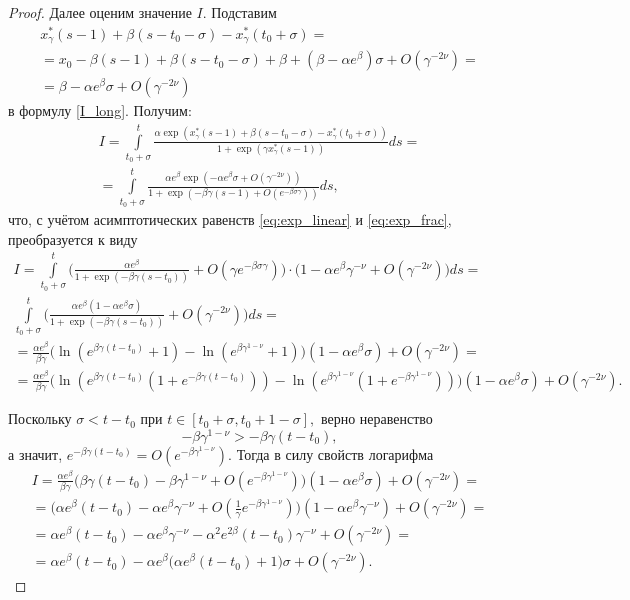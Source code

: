 \begin{proof}
Далее оценим значение $I$. Подставим
%
\begin{multline*}
x^*_{\gamma}(s - 1) + \beta (s - t_0 - \sigma) - x^*_{\gamma} (t_0 + \sigma) =\\
= x_0 - \beta(s - 1) + \beta(s - t_0 - \sigma) + \beta + (\beta - \alpha e^{\beta}) \sigma + O(\gamma^{-2\nu}) =\\
= \beta - \alpha e^{\beta} \sigma + O(\gamma^{-2\nu})
\end{multline*}
%
в формулу \eqref{I_long}. Получим:
\begin{multline*}
	I=\int\limits_{t_0+\sigma}^{t}\frac{\alpha\exp(x_\gamma^*(s-1)+\beta(s-t_0-\sigma)-x_\gamma^*(t_0+\sigma))}{1+\exp(\gamma x_\gamma^*(s-1))} ds =\\
	=\int\limits_{t_0+\sigma}^{t}\frac{\alpha e^{\beta}\exp(-\alpha e^\beta\sigma+O(\gamma^{-2\nu}))}{1+\exp( -\beta\gamma (s-1)+O(e^{-\beta\sigma\gamma}))} ds,
\end{multline*}
%
что, с учётом асимптотических равенств \eqref{eq:exp_linear} и \eqref{eq:exp_frac}, преобразуется к виду
\begin{multline*}
	I = \int\limits_{t_0 + \sigma}^{t}\Big(\frac{\alpha e^\beta}{1 + \exp(-\beta\gamma(s-t_0))} + O(\gamma e^{-\beta\sigma\gamma})\Big) \cdot \big(1-\alpha e^{\beta} \gamma^{-\nu} + O(\gamma^{-2\nu})\big)ds=\\
	\int\limits_{t_0+\sigma}^{t}\Big(\frac{\alpha e^\beta(1-\alpha e^{\beta}\sigma)}{1 + \exp(-\beta\gamma(s-t_0))} + O(\gamma^{-2\nu})\Big)ds=\\
	= \frac{\alpha e^{\beta}}{\beta\gamma}\big(\ln(e^{\beta\gamma(t - t_0)} + 1) - \ln(e^{\beta\gamma^{1-\nu}}+1)\big)(1-\alpha e^{\beta}\sigma)+O(\gamma^{-2\nu})=\\
	= \frac{\alpha e^{\beta}}{\beta\gamma}\big(\ln(e^{\beta\gamma(t-t_0)}(1 + e^{-\beta\gamma(t - t_0)})) - \ln(e^{\beta\gamma^{1 - \nu}}(1 + e^{-\beta\gamma^{1-\nu}}))\big)(1-\alpha e^{\beta}\sigma)+O(\gamma^{-2\nu}).
\end{multline*}
	
Поскольку $\sigma < t - t_0$ при $t \in [t_0+\sigma, t_0 + 1 - \sigma],$ верно неравенство
%
\[-\beta \gamma^{1 - \nu} > - \beta \gamma (t - t_0),\]
%
а значит, $e^{-\beta \gamma (t - t_0)} = O(e^{-\beta\gamma^{1 - \nu}})$.
Тогда в силу свойств логарифма
%
\begin{multline}
	\label{I_step3}
	I=\frac{\alpha e^{\beta}}{\beta\gamma}\big(\beta\gamma(t-t_0)-\beta\gamma^{1-\nu}+O(e^{-\beta\gamma^{1-\nu}})\big)(1-\alpha e^{\beta}\sigma)+O(\gamma^{-2\nu})=\\
	= \big(\alpha e^{\beta}(t-t_0)-\alpha e^{\beta}\gamma^{-\nu} + O(\frac{1}{\gamma} e^{-\beta\gamma^{1-\nu}})\big)(1-\alpha e^{\beta}\gamma^{-\nu})+O(\gamma^{-2\nu})=\\
	= \alpha e^{\beta}(t-t_0)-\alpha e^{\beta}\gamma^{-\nu}-\alpha^2 e^{2\beta}(t-t_0)\gamma^{-\nu}+O(\gamma^{-2\nu})=\\
	= \alpha e^{\beta}(t-t_0)-\alpha e^{\beta}\big(\alpha e^{\beta}(t-t_0)+1\big)\sigma+O(\gamma^{-2\nu}).
\end{multline}



\end{proof}
